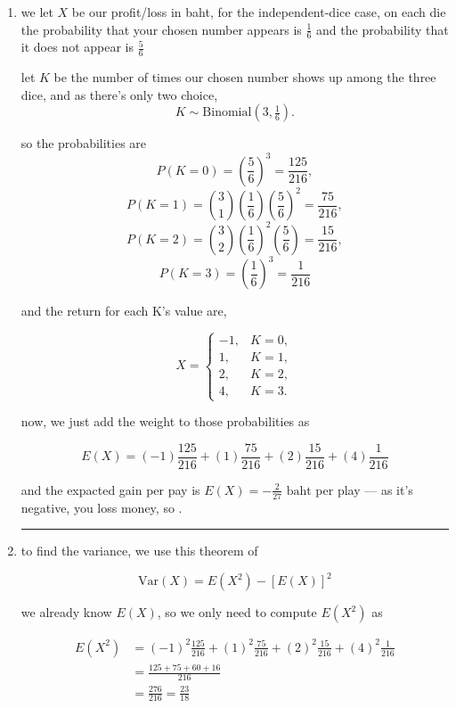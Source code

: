 \medskip
\solution

\begin{enumerate}
    \item we let $X$ be our profit/loss in baht, for the independent-dice case, on each die the probability that your chosen number appears is $\frac{1}{6}$ and the probability that it does not appear is $\frac{5}{6}$

        \vspace{1em}

    let $K$ be the number of times our chosen number shows up among the three dice, and as there's only two choice,
    \[
    K\sim \mathrm{Binomial}(3,\tfrac16).
    \]

    so the probabilities are
    \[
    P(K=0)=\left(\frac56\right)^3=\frac{125}{216},
    \]
    \[
    P(K=1)=\binom31\left(\frac16\right)\left(\frac56\right)^2=\frac{75}{216},
    \]
    \[
    P(K=2)=\binom32\left(\frac16\right)^2\left(\frac56\right)=\frac{15}{216},
    \]
    \[
    P(K=3)=\left(\frac16\right)^3=\frac{1}{216}
    \]

    and the return for each K's value are, 

    \[
    X=
    \begin{cases}
    -1,& K=0,\\
    1,& K=1,\\
    2,& K=2,\\
    4,& K=3.
    \end{cases}
    \]

    now, we just add the weight to those probabilities as 

    \[
    E(X)=(-1)\frac{125}{216}+(1)\frac{75}{216}+(2)\frac{15}{216}+(4)\frac{1}{216}
    \]

        and the expacted gain per pay is $\boxed{E(X)=-\frac{2}{27}\text{ baht}}$ per play --- as it's negative, you loss money, so . 

    \medskip
    \begin{center}
    \rule{0.3\linewidth}{0.2pt}
    \end{center}
    \medskip

    \item to find the variance, we use this theorem of

    \[
    \mathrm{Var}(X)=E(X^2)-[E(X)]^2 
    \]

    we already know $E(X)$, so we only need to compute $E(X^2)$ as

    \begin{align*}
        E(X^2)&=(-1)^2\frac{125}{216}+(1)^2\frac{75}{216}+(2)^2\frac{15}{216}+(4)^2\frac{1}{216} \\
        &=\frac{125+75+60+16}{216} \\
        &=\frac{276}{216}=\frac{23}{18}
    \end{align*}


\end{enumerate}
